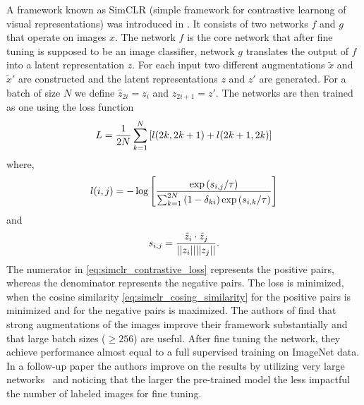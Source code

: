 A framework known as SimCLR (simple framework for contrastive learnong of visual representations) was introduced in \cite{Chen:2020aab}. It consists of two networks $f$ and $g$ that operate on images $x$. The network $f$ is the core network that after fine tuning is supposed to be an image classifier, network $g$ translates the output of $f$ into a latent representation $z$. For each input two different augmentations $\tilde{x}$ and $\tilde{x}'$ are constructed and the latent representations $z$ and $z'$ are generated. For a batch of size $N$ we define $\hat{z}_{2i}=z_i$ and $\hat{z}_{2i+1}=z'$. The networks are then trained as one using the loss function
\begin{equation}
L=\frac{1}{2N}\sum_{k=1}^N\left[l{\left( 2k, 2k+1 \right)} + l{\left( 2k+1, 2k \right)}\right]
\end{equation}
where,
\begin{equation}\label{eq:simclr_contrastive_loss}
l{\left( i, j \right)}=-\log\left[ \frac{\exp{\left( s_{i,j}/\tau \right)}}{\sum_{k=1}^{2N}{\left( 1-\delta_{ki} \right)}\exp{\left( s_{i,k}/\tau \right)}}\right]
\end{equation}
and
\begin{equation}\label{eq:simclr_cosing_similarity}
s_{i, j} = \frac{\hat{z}_i\cdot\hat{z}_j}{{\left|\left| z_i \right|\right|}{\left|\left| z_j \right|\right|}}.
\end{equation}
The numerator in \eqref{eq:simclr_contrastive_loss} represents the positive pairs, whereas the denominator represents the negative pairs. The loss is minimized, when the cosine similarity \eqref{eq:simclr_cosing_similarity} for the positive pairs is minimized and for the negative pairs is maximized. The authors of \cite{Chen:2020aab} find that strong augmentations of the images improve their framework substantially and that large batch sizes ($\geq 256$) are useful. After fine tuning the network, they achieve performance almost equal to a full supervised training on ImageNet data. In a follow-up paper the authors improve on the results by utilizing very large networks~\cite{Chen:2020aac} and noticing that the larger the pre-trained model the less impactful the number of labeled images for fine tuning.

